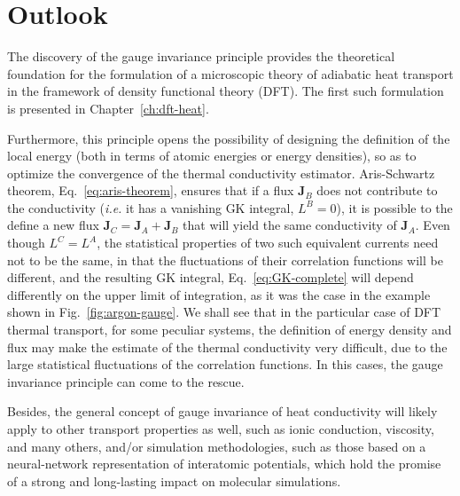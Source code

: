 \section{Outlook}  \label{sec:gauge-outlook}
\begin{LEtext}
The discovery of the gauge invariance principle provides the theoretical foundation for the formulation of a microscopic theory of adiabatic heat transport in the framework of density functional theory (DFT). The first such formulation is presented in Chapter~\ref{ch:dft-heat}. 

Furthermore, this principle opens the possibility of designing the definition of the local energy (both in terms of atomic energies or energy densities), so as to optimize the convergence of the thermal conductivity estimator.
Aris-Schwartz theorem, Eq.~\eqref{eq:aris-theorem}, ensures that if a flux $\mathbf{J}_B$ does not contribute to the conductivity (\emph{i.e.} it has a vanishing GK integral, $L^B=0$), it is possible to the define a new flux $\mathbf{J}_C=\mathbf{J}_A+\mathbf{J}_B$ that will yield the same conductivity of $\mathbf{J}_A$. Even though $L^C=L^A$, the statistical properties of two such equivalent currents need not to be the same, in that the fluctuations of their correlation functions will be different, and the resulting GK integral, Eq.~\eqref{eq:GK-complete} will depend differently on the upper limit of integration, as it was the case in the example shown in Fig.~\ref{fig:argon-gauge}.
We shall see that in the particular case of DFT thermal transport, for some peculiar systems, the definition of energy density and flux may make the estimate of the thermal conductivity very difficult, due to the large statistical fluctuations of the correlation functions. In this cases, the gauge invariance principle can come to the rescue.

Besides, the general concept of gauge invariance of heat conductivity will likely apply to other transport properties as well, such as ionic conduction, viscosity, and many others, and/or simulation methodologies, such as those based on a neural-network representation of interatomic potentials, which hold the promise of a strong and long-lasting impact on molecular simulations. 
\end{LEtext}
